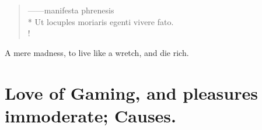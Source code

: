 \begin{latin}
\begin{verse}%
------manifesta phrenesis\\*
Ut locuples moriaris egenti vivere fato.\\!
\end{verse}%
\end{latin}

A mere madness, to live like a wretch, and die rich.

\section[Love of Gaming]{Love of Gaming, \etc{} and pleasures immoderate; Causes.}

